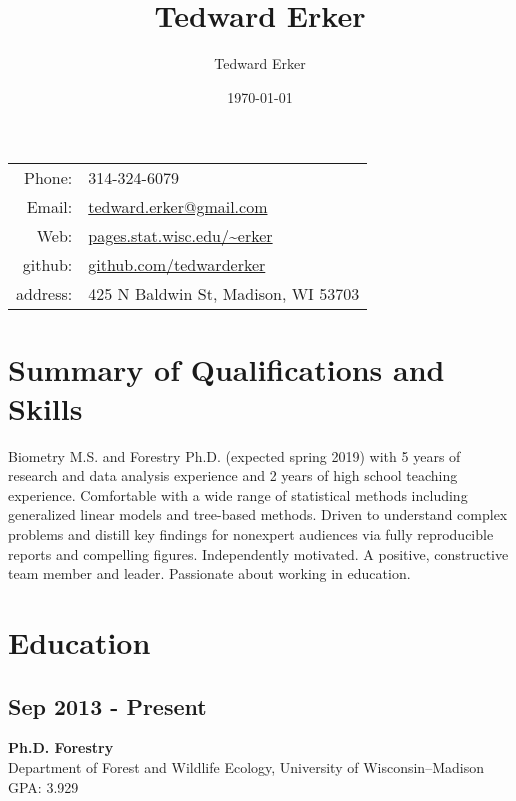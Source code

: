 \documentclass{article}
\author{Tedward Erker}
\date{\today}
\title{Tedward Erker}
\begin{document}
\maketitle
{}

\begin{center}
\begin{tabular}{rp{}}
Phone: & 314-324-6079\\
Email: & \href{mailto:erker@wisc.edu}{tedward.erker@gmail.com}\\
Web: & \href{http://pages.stat.wisc.edu/\~erker/}{pages.stat.wisc.edu/\textasciitilde{}erker}\\
github: & \href{https://github.com/tedwarderker}{github.com/tedwarderker}\\
address: & 425 N Baldwin St, Madison, WI 53703\\
\end{tabular}
\end{center}




\section*{Summary of Qualifications and Skills}
\label{sec:org1ff89d4}
{\textwidth
Biometry M.S. and Forestry Ph.D. (expected spring 2019) with 5 years
of research and data analysis experience and 2 years of high school
teaching experience.  Comfortable with a wide range of statistical
methods including generalized linear models and tree-based
methods. Driven to understand complex problems and distill key
findings for nonexpert audiences via fully reproducible reports and
compelling figures.  Independently motivated. A positive, constructive
team member and leader.  Passionate about working in education.
\par}
\section*{Education}
\label{sec:org27873ee}
\subsection*{Sep 2013 - Present}
\label{sec:org5c7231c}
\textbf{Ph.D. Forestry} \\
Department of Forest and Wildlife Ecology, University of Wisconsin--Madison \\
GPA: 3.929
\end{document}
